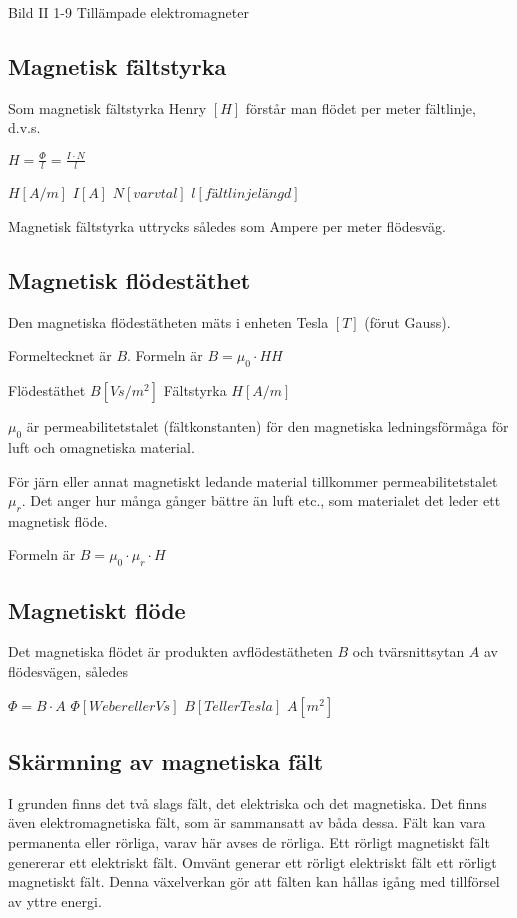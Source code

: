 Bild II 1-9 Tillämpade elektromagneter

\subsection{Magnetisk fältstyrka}

Som magnetisk fältstyrka Henry $[H]$ förstår man flödet per meter fältlinje, d.v.s.

$H=\frac{\Phi}{l} = \frac{I \cdot N}{l}$

$H [A/m]$ $I [A]$ $N [varvtal]$ $l [fältlinjelängd]$

Magnetisk fältstyrka uttrycks således som Ampere per meter flödesväg.

\subsection{Magnetisk flödestäthet}

Den magnetiska flödestätheten mäts i enheten Tesla $[T]$ (förut Gauss).

Formeltecknet är $B$.
Formeln är $B = \mu_0 \cdot HH$

Flödestäthet $B [Vs/m^2]$ Fältstyrka $H [A/m]$

$\mu_0$ är permeabilitetstalet (fältkonstanten) för den magnetiska ledningsförmåga för
luft och omagnetiska material.

För järn eller annat magnetiskt ledande material tillkommer permeabilitetstalet $\mu_r$.
Det anger hur många gånger bättre än luft etc., som materialet det leder ett magnetisk
flöde.

Formeln är $B = \mu_0 \cdot \mu_r \cdot H$

\subsection{Magnetiskt flöde}

Det magnetiska flödet är produkten avflödestätheten $B$ och tvärsnittsytan $A$ av flödesvägen, således

$\Phi = B \cdot A$
$\Phi [Weber eller Vs]$ $B [T eller Tesla]$ $A [m^2]$

\subsection{Skärmning av magnetiska fält}

I grunden finns det två slags fält, det elektriska och det magnetiska. Det finns även
elektromagnetiska fält, som är sammansatt av båda dessa. Fält kan vara permanenta eller
rörliga, varav här avses de rörliga. Ett rörligt magnetiskt fält genererar ett elektriskt
fält.
Omvänt generar ett rörligt elektriskt fält ett rörligt magnetiskt fält. Denna växelverkan
gör att fälten kan hållas igång med tillförsel av yttre energi.


